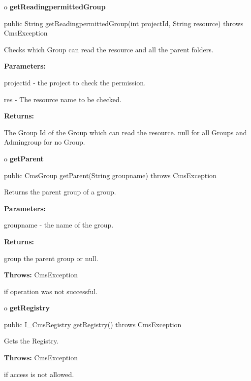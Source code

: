 o {\bf getReadingpermittedGroup}

\begin{PRE}
 public String getReadingpermittedGroup(int projectId,
                                        String resource) throws CmsException
\end{PRE}

\begin{description}
\htmlDD Checks which Group can read the resource and all the parent folders.

\begin{description}
\item {\bf Parameters:}

projectid - the project to check the permission.

res - The resource name to be checked.
\item {\bf Returns:}

The Group Id of the Group which can read the resource.  null for all Groups
and  Admingroup for no Group.
\end{description}

\end{description}

o {\bf getParent}

\begin{PRE}
 public CmsGroup getParent(String groupname) throws CmsException
\end{PRE}

\begin{description}
\htmlDD Returns the parent group of a group.

\begin{description}
\item {\bf Parameters:}

groupname - the name of the group.
\item {\bf Returns:}

group the parent group or null.
\item {\bf Throws:} CmsException

if operation was not successful.
\end{description}

\end{description}

o {\bf getRegistry}

\begin{PRE}
 public I\_CmsRegistry getRegistry() throws CmsException
\end{PRE}

\begin{description}
\htmlDD Gets the Registry.

\begin{description}
\item {\bf Throws:} CmsException

if access is not allowed.
\end{description}

\end{description}

